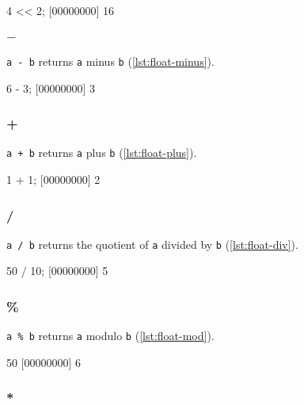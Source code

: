 \begin{urbiscript}[caption=Float.'$<<$', label=lst:float-lshift]
4 << 2;
[00000000] 16
\end{urbiscript}

\subsubsection{$-$}

\lstinline|a - b| returns \lstinline|a| minus \lstinline|b| (\autoref{lst:float-minus}).

\begin{urbiscript}[caption=Float.'-', label=lst:float-minus]
6 - 3;
[00000000] 3
\end{urbiscript}

\subsubsection{+}

\lstinline|a + b| returns \lstinline|a| plus \lstinline|b| (\autoref{lst:float-plus}).

\begin{urbiscript}[caption=Float.'+', label=lst:float-plus]
1 + 1;
[00000000] 2
\end{urbiscript}

\subsubsection{/}

\lstinline|a / b| returns the quotient of \lstinline|a| divided by
\lstinline|b| (\autoref{lst:float-div}).

\begin{urbiscript}[caption=Float.'/', label=lst:float-div]
50 / 10;
[00000000] 5
\end{urbiscript}

\subsubsection{\%}

\lstinline|a % b|
returns \lstinline|a| modulo \lstinline|b| (\autoref{lst:float-mod}).

\begin{urbiscript}[caption=Float.'\%', label=lst:float-mod]
50 %
[00000000] 6
\end{urbiscript}

\subsubsection{*}

